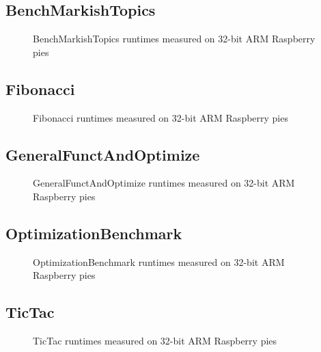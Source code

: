 
\newpage
\subsection{BenchMarkishTopics}
    
    \begin{figure}[h]
	    \centering
		
        \caption{BenchMarkishTopics runtimes measured on 32-bit ARM Raspberry pies}
	\end{figure}
    


\newpage
\subsection{Fibonacci}
    
    \begin{figure}[h]
	    \centering
		
        \caption{Fibonacci runtimes measured on 32-bit ARM Raspberry pies}
	\end{figure}
    


\newpage
\subsection{GeneralFunctAndOptimize}
    
    \begin{figure}[h]
	    \centering
		
        \caption{GeneralFunctAndOptimize runtimes measured on 32-bit ARM Raspberry pies}
	\end{figure}
    


\newpage
\subsection{OptimizationBenchmark}
    
    \begin{figure}[h]
	    \centering
		
        \caption{OptimizationBenchmark runtimes measured on 32-bit ARM Raspberry pies}
	\end{figure}
    


\newpage
\subsection{TicTac}
    
    \begin{figure}[h]
	    \centering
		
        \caption{TicTac runtimes measured on 32-bit ARM Raspberry pies}
	\end{figure}
    



